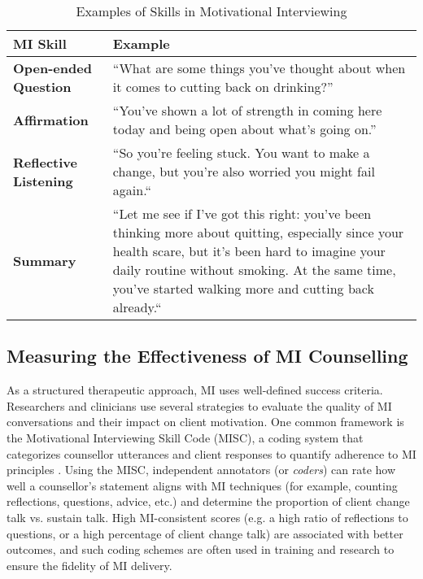 \begin{table}[ht!]
\centering
\begin{tabular}{@{} p{} p{} @{}}
\toprule
\textbf{MI Skill} & \textbf{Example} \\
\midrule
\textbf{Open-ended Question} & 
``What are some things you've thought about when it comes to cutting back on drinking?'' \\
\addlinespace
\textbf{Affirmation} & 
``You've shown a lot of strength in coming here today and being open about what’s going on.'' \\
\addlinespace
\textbf{Reflective Listening} & 
``So you're feeling stuck. You want to make a change, but you're also worried you might fail again.`` \\
\addlinespace
\textbf{Summary} & 
``Let me see if I've got this right: you've been thinking more about quitting, especially since your health scare, but it's been hard to imagine your daily routine without smoking. At the same time, you’ve started walking more and cutting back already.`` \\
\bottomrule
\end{tabular}
\caption{Examples of Skills in Motivational Interviewing}
\label{tab:mi_skill_examples}
\end{table}




\subsection{Measuring the Effectiveness of MI Counselling}
As a structured therapeutic approach, MI uses well-defined success criteria. Researchers and clinicians use several strategies to evaluate the quality of MI conversations and their impact on client motivation. One common framework is the Motivational Interviewing Skill Code (MISC), a coding system that categorizes counsellor utterances and client responses to quantify adherence to MI principles \cite{Houck2010}. Using the MISC, independent annotators (or \emph{coders}) can rate how well a counsellor's statement aligns with MI techniques (for example, counting reflections, questions, advice, etc.) and determine the proportion of client change talk vs. sustain talk. High MI-consistent scores (e.g. a high ratio of reflections to questions, or a high percentage of client change talk) are associated with better outcomes, and such coding schemes are often used in training and research to ensure the fidelity of MI delivery.

